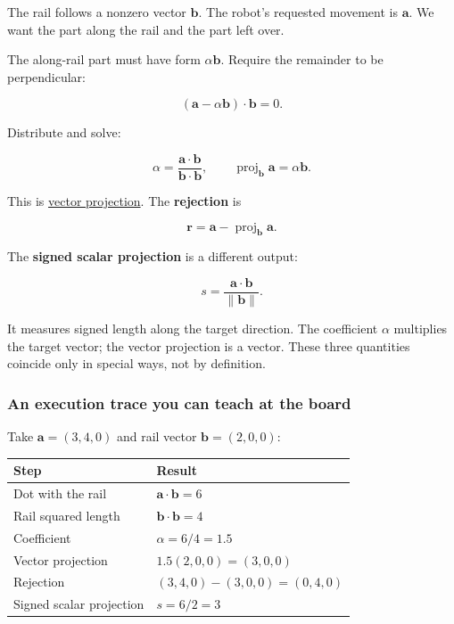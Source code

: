 The rail follows a nonzero vector \(\mathbf b\). The robot's requested movement is \(\mathbf a\). We want the part along the rail and the part left over.

The along-rail part must have form \(\alpha\mathbf b\). Require the remainder to be perpendicular:

\[
(\mathbf a-\alpha\mathbf b)\cdot\mathbf b=0.
\]

Distribute and solve:

\[
\alpha=\frac{\mathbf a\cdot\mathbf b}{\mathbf b\cdot\mathbf b},\qquad
\operatorname{proj}_{\mathbf b}\mathbf a=\alpha\mathbf b.
\]

This is \hyperref[01-foundations-i-ch017]{vector projection}. The \textbf{rejection} is

\[
\mathbf r=\mathbf a-\operatorname{proj}_{\mathbf b}\mathbf a.
\]

The \textbf{signed scalar projection} is a different output:

\[
s=\frac{\mathbf a\cdot\mathbf b}{\|\mathbf b\|}.
\]

It measures signed length along the target direction. The coefficient \(\alpha\) multiplies the target vector; the vector projection is a vector. These three quantities coincide only in special ways, not by definition.

\subsubsection{An execution trace you can teach at the board}\label{an-execution-trace-you-can-teach-at-the-board}

Take \(\mathbf a=(3,4,0)\) and rail vector \(\mathbf b=(2,0,0)\):

{\def\LTcaptype{none} %
\begin{longtable}[]{@{}ll@{}}
\toprule\noalign{}
Step & Result \\
\midrule\noalign{}
\endhead
\bottomrule\noalign{}
\endlastfoot
Dot with the rail & \(\mathbf a\cdot\mathbf b=6\) \\
Rail squared length & \(\mathbf b\cdot\mathbf b=4\) \\
Coefficient & \(\alpha=6/4=1.5\) \\
Vector projection & \(1.5(2,0,0)=(3,0,0)\) \\
Rejection & \((3,4,0)-(3,0,0)=(0,4,0)\) \\
Signed scalar projection & \(s=6/2=3\) \\
\end{longtable}
}

